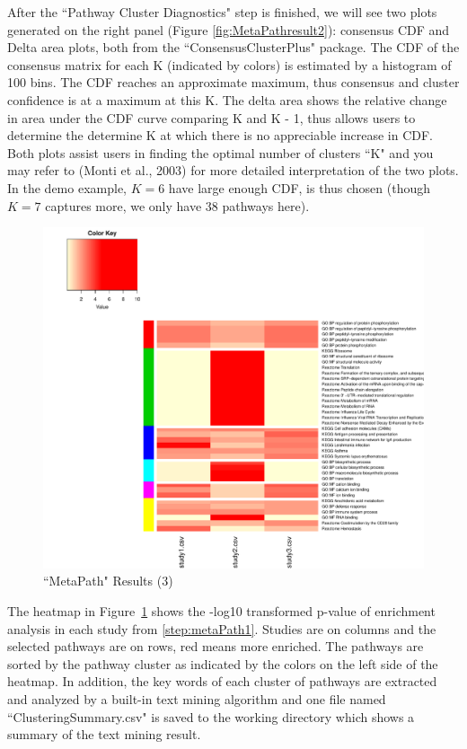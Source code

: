 After the ``Pathway Cluster Diagnostics" step is finished, we will see two plots generated on the right panel (Figure \ref{fig:MetaPathresult2}): consensus CDF and Delta area plots, both from the ``ConsensusClusterPlus" package. The CDF of the consensus matrix for each K (indicated by colors) is estimated by a histogram of 100 bins. The CDF
reaches an approximate maximum, thus consensus and cluster confidence is at a maximum at this K. The delta area shows the relative change in area under the CDF curve comparing K and K - 1, thus allows users to determine the determine K at which there is no appreciable increase in CDF. Both plots assist users in finding the optimal number of clusters ``K" and you may refer to (Monti et al., 2003) for more detailed interpretation of the two plots. In the demo example, $K=6$ have large enough CDF, is thus chosen (though $K=7$ captures more, we only have 38 pathways here). 

\begin{figure}[H]
\begin{center}
\includegraphics[scale=0.45]{./figure/metaPath/Heatmap_clusters_all.pdf}
\caption{``MetaPath" Results (3)}
\label{fig:MetaPathresult3}
\end{center}
\end{figure}


The heatmap in Figure~\ref{fig:MetaPathresult3} shows the -log10 transformed p-value of enrichment analysis in each study from \ref{step:metaPath1}. 
Studies are on columns and the selected pathways are on rows, red means more enriched. The pathways are sorted by the pathway cluster as indicated by the colors on the left side of the heatmap. 
In addition, 
the key words of each cluster of pathways are extracted and analyzed by a built-in text mining algorithm and one file named ``Clustering\textunderscore Summary.csv" is saved to the working directory which shows a summary of the text mining result. 



